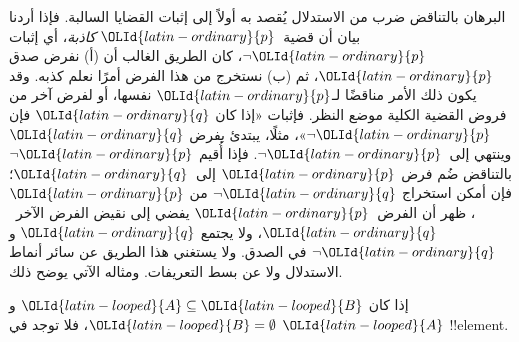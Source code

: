 \documentclass[../../../include/open-logic-section]{subfiles}
\begin{document}


البرهان بالتناقض ضرب من الاستدلال يُقصد به أولاً إلى إثبات القضايا
السالبة. فإذا أردنا بيان أن قضية~${\OLId{latin-ordinary}{p}}$ \emph{كاذبة}، أي إثبات
$\lnot {\OLId{latin-ordinary}{p}}$، كان الطريق الغالب أن (أ) نفرض صدق ${\OLId{latin-ordinary}{p}}$، ثم (ب) نستخرج من
هذا الفرض أمرًا نعلم كذبه. وقد يكون ذلك الأمر مناقضًا لـ${\OLId{latin-ordinary}{p}}$ نفسها، أو
لفرض آخر من فروض القضية الكلية موضع النظر. فإثبات «إذا كان ${\OLId{latin-ordinary}{q}}$ فإن
$\lnot {\OLId{latin-ordinary}{p}}$»، مثلًا، يبتدئ بفرض ${\OLId{latin-ordinary}{q}}$ وينتهي إلى~$\lnot {\OLId{latin-ordinary}{p}}$. فإذا أُقيم
$\lnot {\OLId{latin-ordinary}{p}}$ بالتناقض ضُم فرض ${\OLId{latin-ordinary}{p}}$ إلى~${\OLId{latin-ordinary}{q}}$؛ فإن أمكن استخراج $\lnot {\OLId{latin-ordinary}{q}}$
من ${\OLId{latin-ordinary}{p}}$، ظهر أن الفرض~${\OLId{latin-ordinary}{p}}$ يفضي إلى نقيض الفرض الآخر~${\OLId{latin-ordinary}{q}}$، ولا يجتمع
${\OLId{latin-ordinary}{q}}$ و$\lnot {\OLId{latin-ordinary}{q}}$ في الصدق. ولا يستغني هذا الطريق عن سائر أنماط
الاستدلال ولا عن بسط التعريفات. ومثاله الآتي يوضح ذلك.

\begin{prop}
  إذا كان ${\OLId{latin-looped}{A}} \subseteq {\OLId{latin-looped}{B}}$ و${\OLId{latin-looped}{B}} = \emptyset$، فلا توجد في ${\OLId{latin-looped}{A}}$
  !!{element}.
\end{prop}
\end{document}
